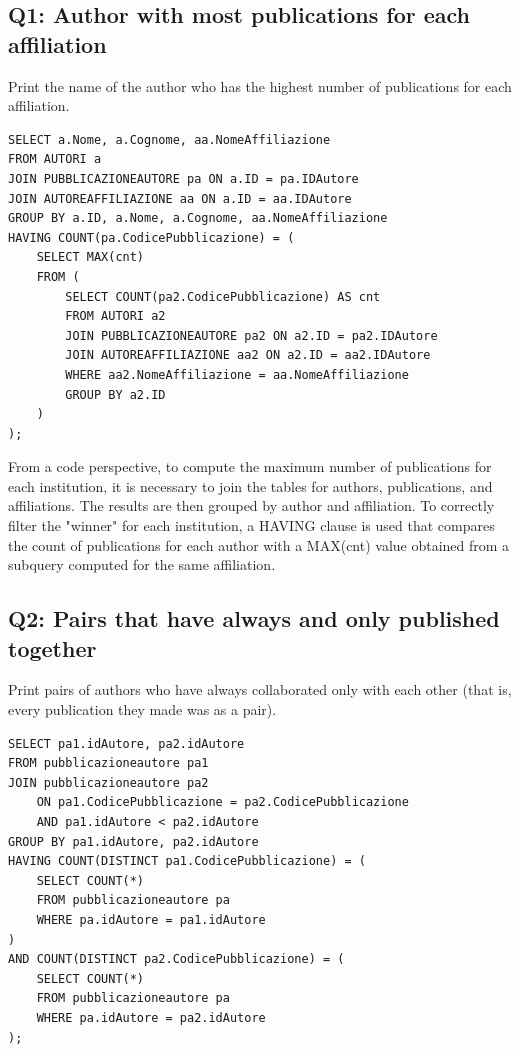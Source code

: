 \documentclass[a4paper,12pt]{article}
\begin{document}
\subsection*{Q1: Author with most publications for each affiliation}
 Print the name of the author who has the highest number of publications for each affiliation.
\begin{lstlisting}
SELECT a.Nome, a.Cognome, aa.NomeAffiliazione
FROM AUTORI a
JOIN PUBBLICAZIONEAUTORE pa ON a.ID = pa.IDAutore
JOIN AUTOREAFFILIAZIONE aa ON a.ID = aa.IDAutore
GROUP BY a.ID, a.Nome, a.Cognome, aa.NomeAffiliazione
HAVING COUNT(pa.CodicePubblicazione) = (
    SELECT MAX(cnt)
    FROM (
        SELECT COUNT(pa2.CodicePubblicazione) AS cnt
        FROM AUTORI a2
        JOIN PUBBLICAZIONEAUTORE pa2 ON a2.ID = pa2.IDAutore
        JOIN AUTOREAFFILIAZIONE aa2 ON a2.ID = aa2.IDAutore
        WHERE aa2.NomeAffiliazione = aa.NomeAffiliazione
        GROUP BY a2.ID
    )
);
\end{lstlisting}

From a code perspective, to compute the maximum number of publications for each institution, it is necessary to join the tables for authors, publications, and affiliations. The results are then grouped by author and affiliation. To correctly filter the "winner" for each institution, a HAVING clause is used that compares the count of publications for each author with a MAX(cnt) value obtained from a subquery computed for the same affiliation.


\subsection*{Q2: Pairs that have always and only published together}
Print pairs of authors who have always collaborated only with each other (that is, every publication they made was as a pair).
\begin{lstlisting}
SELECT pa1.idAutore, pa2.idAutore
FROM pubblicazioneautore pa1
JOIN pubblicazioneautore pa2 
    ON pa1.CodicePubblicazione = pa2.CodicePubblicazione 
    AND pa1.idAutore < pa2.idAutore
GROUP BY pa1.idAutore, pa2.idAutore
HAVING COUNT(DISTINCT pa1.CodicePubblicazione) = (
    SELECT COUNT(*) 
    FROM pubblicazioneautore pa
    WHERE pa.idAutore = pa1.idAutore
)
AND COUNT(DISTINCT pa2.CodicePubblicazione) = (
    SELECT COUNT(*) 
    FROM pubblicazioneautore pa
    WHERE pa.idAutore = pa2.idAutore
);

\end{lstlisting}
\end{document}
